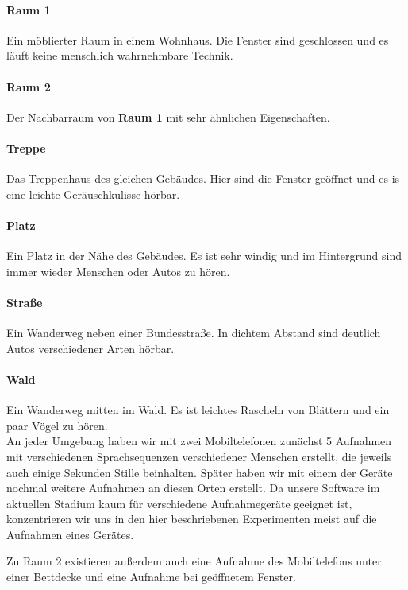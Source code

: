 \documentclass[
	fontsize=10.5pt,
	marginpar=false,
	ngerman,
	accentcolor=3d
	]{tudapub}
\begin{document}
\paragraph{Raum 1} Ein möblierter Raum in einem Wohnhaus. Die Fenster sind geschlossen und es läuft keine menschlich wahrnehmbare Technik.
\paragraph{Raum 2} Der Nachbarraum von \textbf{Raum 1} mit sehr ähnlichen Eigenschaften.
\paragraph{Treppe} Das Treppenhaus des gleichen Gebäudes. Hier sind die Fenster geöffnet und es is eine leichte Geräuschkulisse hörbar.
\paragraph{Platz} Ein Platz in der Nähe des Gebäudes. Es ist sehr windig und im Hintergrund sind immer wieder Menschen oder Autos zu hören.
\paragraph{Straße} Ein Wanderweg neben einer Bundesstraße. In dichtem Abstand sind deutlich Autos verschiedener Arten hörbar.
\paragraph{Wald} Ein Wanderweg mitten im Wald. Es ist leichtes Rascheln von Blättern und ein paar Vögel zu hören.\\

An jeder Umgebung haben wir mit zwei Mobiltelefonen zunächst 5 Aufnahmen mit verschiedenen Sprachsequenzen verschiedener Menschen erstellt, die jeweils auch einige Sekunden Stille beinhalten. Später haben wir mit einem der Geräte nochmal weitere Aufnahmen an diesen Orten erstellt. Da unsere Software im aktuellen Stadium kaum für verschiedene Aufnahmegeräte geeignet ist, konzentrieren wir uns in den hier beschriebenen Experimenten meist auf die Aufnahmen eines Gerätes.

Zu Raum 2 existieren außerdem auch eine Aufnahme des Mobiltelefons unter einer Bettdecke und eine Aufnahme bei geöffnetem Fenster.
\end{document}
